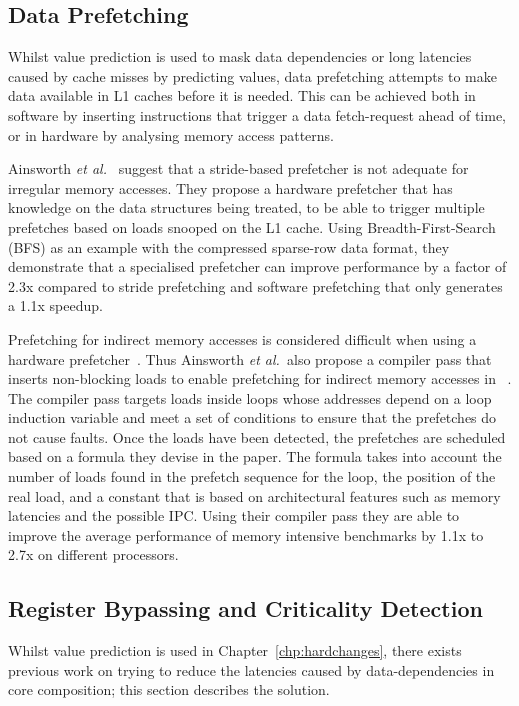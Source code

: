 \subsection{Data Prefetching}
Whilst value prediction is used to mask data dependencies or long latencies caused by cache misses by predicting values, data prefetching attempts to make data available in L1 caches before it is needed.
This can be achieved both in software by inserting instructions that trigger a data fetch-request ahead of time, or in hardware by analysing memory access patterns.

Ainsworth {\it et al.~}\cite{graphPrefetch2016} suggest that a stride-based prefetcher is not adequate for irregular memory accesses.
They propose a hardware prefetcher that has knowledge on the data structures being treated, to be able to trigger multiple prefetches based on loads snooped on the L1 cache.
Using Breadth-First-Search (BFS) as an example with the compressed sparse-row data format, they demonstrate that a specialised prefetcher can improve performance by a factor of 2.3x compared to stride prefetching and software prefetching that only generates a 1.1x speedup.

Prefetching for indirect memory accesses is considered difficult when using a hardware prefetcher~\cite{lee2012whenprefetchworks,prefetchForIndirect2017}.
Thus Ainsworth {\it et al.~}also propose a compiler pass that inserts non-blocking loads to enable prefetching for indirect memory accesses in ~\cite{prefetchForIndirect2017}.
The compiler pass targets loads inside loops whose addresses depend on a loop induction variable and meet a set of conditions to ensure that the prefetches do not cause faults.
Once the loads have been detected, the prefetches are scheduled based on a formula they devise in the paper.
The formula takes into account the number of loads found in the prefetch sequence for the loop, the position of the real load, and a constant that is based on architectural features such as memory latencies and the possible IPC.
Using their compiler pass they are able to improve the average performance of memory intensive benchmarks by 1.1x to 2.7x on different processors.
\vspace{-1em}
\subsection{Register Bypassing and Criticality Detection}
Whilst value prediction is used in Chapter~\ref{chp:hardchanges}, there exists previous work on trying to reduce the latencies caused by data-dependencies in core composition; this section describes the solution.

